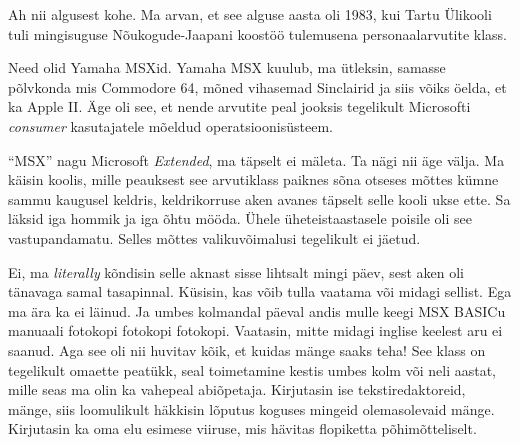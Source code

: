 
Ah nii algusest kohe. Ma arvan, et see alguse aasta oli 1983, kui  Tartu 
Ülikooli tuli mingisuguse Nõukogude-Jaapani koostöö 
tulemusena personaalarvutite klass.


Need olid Yamaha MSXid. Yamaha MSX kuulub, ma 
ütleksin, samasse põlvkonda mis Commodore 64, mõned vihasemad Sinclairid ja 
siis võiks öelda, et ka Apple II. Äge oli see, et  nende arvutite peal jooksis 
tegelikult Microsofti  \emph{consumer} kasutajatele mõeldud operatsioonisüsteem.


\enquote{MSX} nagu Microsoft \emph{Extended}, ma täpselt ei mäleta. Ta nägi nii äge välja. Ma käisin koolis, mille peauksest see 
arvutiklass paiknes sõna otseses mõttes kümne sammu kaugusel  
keldris, keldrikorruse aken avanes täpselt selle kooli ukse ette. Sa läksid 
iga hommik ja iga õhtu mööda. Ühele üheteistaastasele 
poisile oli see vastupandamatu. Selles mõttes valikuvõimalusi tegelikult  
ei jäetud. 


Ei, ma \emph{literally} kõndisin selle aknast sisse lihtsalt mingi päev, sest 
aken oli tänavaga samal tasapinnal. Küsisin, kas võib tulla vaatama või midagi 
sellist. Ega ma ära ka ei läinud. Ja  umbes kolmandal päeval 
andis mulle keegi MSX BASICu 
manuaali fotokopi fotokopi fotokopi. Vaatasin, mitte midagi 
inglise keelest aru ei saanud. Aga see oli nii huvitav kõik, et kuidas mänge saaks 
teha! See klass on tegelikult omaette peatükk, seal toimetamine kestis  
umbes kolm või neli aastat, mille seas ma olin ka vahepeal abiõpetaja. 
 Kirjutasin ise tekstiredaktoreid, mänge, siis loomulikult häkkisin 
lõputus koguses mingeid olemasolevaid mänge. Kirjutasin ka oma elu esimese 
viiruse, mis hävitas flopiketta põhimõtteliselt. 


